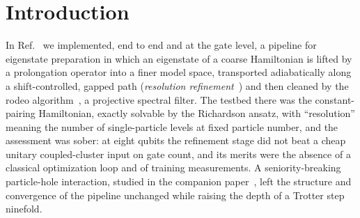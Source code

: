 \documentclass[
  aps,
  prc,
  reprint,
  superscriptaddress,
  floatfix,
  nofootinbib
]{revtex4-2}
\begin{document}
\maketitle

\section{Introduction}
In Ref.~\cite{EigenQPairing2026} we implemented, end to end and at the gate
level, a pipeline for eigenstate preparation in which an eigenstate of a
coarse Hamiltonian is lifted by a prolongation operator into a finer model
space, transported adiabatically along a shift-controlled, gapped path
(\emph{resolution refinement}~\cite{Bogner2026}) and then cleaned by the
rodeo algorithm~\cite{Choi2021,Qian2024}, a projective spectral filter.  The
testbed there was the constant-pairing Hamiltonian, exactly solvable by the
Richardson ansatz, with ``resolution'' meaning the number of single-particle
levels at fixed particle number, and the assessment was sober: at eight
qubits the refinement stage did not beat a cheap unitary coupled-cluster
input on gate count, and its merits were the absence of a classical
optimization loop and of training measurements.  A seniority-breaking
particle-hole interaction, studied in the companion paper~\cite{PHcompanion},
left the structure and convergence of the pipeline unchanged while raising the
depth of a Trotter step ninefold.
\end{document}
